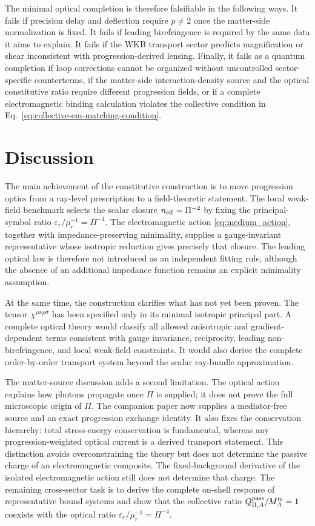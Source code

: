 \documentclass[12pt]{article}
\begin{document}
The minimal optical completion is therefore falsifiable in the following ways.  It fails if precision delay and deflection require $p\ne2$ once the matter-side normalization is fixed.  It fails if leading birefringence is required by the same data it aims to explain.  It fails if the WKB transport sector predicts magnification or shear inconsistent with progression-derived lensing.  Finally, it fails as a quantum completion if loop corrections cannot be organized without uncontrolled sector-specific counterterms, if the matter-side interaction-density source and the optical constitutive ratio require different progression fields, or if a complete electromagnetic binding calculation violates the collective condition in Eq.~\eqref{eq:collective-em-matching-condition}.

\section{Discussion}
\label{sec:discussion}

The main achievement of the constitutive construction is to move progression optics from a ray-level prescription to a field-theoretic statement.  The local weak-field benchmark selects the scalar closure $n_{\rm eff}=\Pi^{-2}$ by fixing the principal-symbol ratio $\varepsilon_r/\mu_r^{-1}=\Pi^{-4}$.  The electromagnetic action \eqref{eq:medium_action}, together with impedance-preserving minimality, supplies a gauge-invariant representative whose isotropic reduction gives precisely that closure.  The leading optical law is therefore not introduced as an independent fitting rule, although the absence of an additional impedance function remains an explicit minimality assumption.

At the same time, the construction clarifies what has not yet been proven.  The tensor $\chi^{\mu\nu\rho\sigma}$ has been specified only in its minimal isotropic principal part.  A complete optical theory would classify all allowed anisotropic and gradient-dependent terms consistent with gauge invariance, reciprocity, leading non-birefringence, and local weak-field constraints.  It would also derive the complete order-by-order transport system beyond the scalar ray-bundle approximation.

The matter-source discussion adds a second limitation.  The optical action explains how photons propagate once $\Pi$ is supplied; it does not prove the full microscopic origin of $\Pi$.  The companion paper now supplies a mediator-free source and an exact progression exchange identity.  It also fixes the conservation hierarchy: total stress-energy conservation is fundamental, whereas any progression-weighted optical current is a derived transport statement.  This distinction avoids overconstraining the theory but does not determine the passive charge of an electromagnetic composite.  The fixed-background derivative of the isolated electromagnetic action still does not determine that charge.  The remaining cross-sector task is to derive the complete on-shell response of representative bound systems and show that the collective ratio $Q_{\Pi,A}^{\rm pass}/M_A^{\rm in}=1$ coexists with the optical ratio $\varepsilon_r/\mu_r^{-1}=\Pi^{-4}$.
\end{document}
